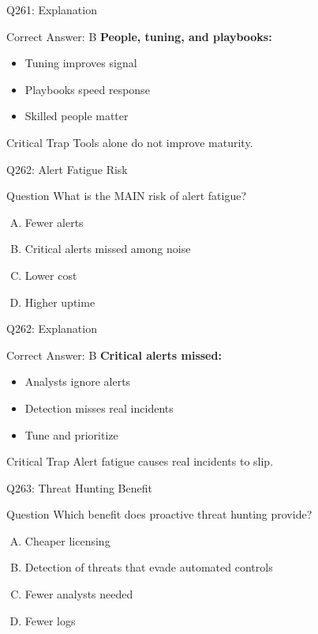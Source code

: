 \documentclass{beamer}
\begin{document}
	\begin{frame}{Q261: Explanation}
		\begin{block}{Correct Answer: B}
			\textbf{People, tuning, and playbooks:}
			\begin{itemize}
				\item Tuning improves signal
				\item Playbooks speed response
				\item Skilled people matter
			\end{itemize}
		\end{block}
		\begin{alertblock}{Critical Trap}
			Tools alone do not improve maturity.
		\end{alertblock}
	\end{frame}
	
	\begin{frame}{Q262: Alert Fatigue Risk}
		\begin{block}{Question}
			What is the MAIN risk of alert fatigue?
		\end{block}
		\begin{enumerate}[(A)]
			\item Fewer alerts
			\item Critical alerts missed among noise
			\item Lower cost
			\item Higher uptime
		\end{enumerate}
	\end{frame}
	
	\begin{frame}{Q262: Explanation}
		\begin{block}{Correct Answer: B}
			\textbf{Critical alerts missed:}
			\begin{itemize}
				\item Analysts ignore alerts
				\item Detection misses real incidents
				\item Tune and prioritize
			\end{itemize}
		\end{block}
		\begin{alertblock}{Critical Trap}
			Alert fatigue causes real incidents to slip.
		\end{alertblock}
	\end{frame}
	
	\begin{frame}{Q263: Threat Hunting Benefit}
		\begin{block}{Question}
			Which benefit does proactive threat hunting provide?
		\end{block}
		\begin{enumerate}[(A)]
			\item Cheaper licensing
			\item Detection of threats that evade automated controls
			\item Fewer analysts needed
			\item Fewer logs
		\end{enumerate}
	\end{frame}
	
\end{document}
